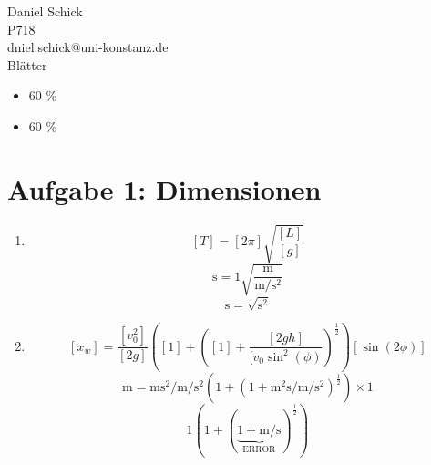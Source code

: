 \documentclass{gadsescript}
\begin{document}
\maketitle
Daniel Schick\\
P718\\
dniel.schick@uni-konstanz.de\\
Blätter\\
\begin{itemize}
	\item 60 \%
	\item 60 \%
\end{itemize}

\section*{Aufgabe 1: Dimensionen}
\begin{enumerate}[label=\alph*)]
	\item \[ [T] = [2 \pi] \sqrt{\frac{[L]}{[g]}} \]
		\[ \unit{\second} = 1 \sqrt{\frac{\unit{\metre}}{\unit{\metre\per\square\second}}} \]
		\[ \unit{\second} = \sqrt{\unit{\square\second}} \]
	\item \[ [x_w] = \frac{[v_0^2]}{[2g]} \left([1] + \left( [1] + \frac{[2gh]}{[v_0\operatorname{sin}^2(\phi)} \right)^{\frac{1}{2}} \right) [\sin (2\phi)] \]
		\[ \unit{\metre} = \unit{\metre\square\second\per\metre\per\square\second} \left( 1 + \left( 1 + \unit{\square\metre\second\per\metre\per\square\second} \right)^{\frac{1}{2}} \right) \times 1 \]
		\[ 1 \left( 1 + \left( \underbrace{1 + \unit{\metre\per\second}}_{\text{ERROR}} \right)^{\frac{1}{2}} \right) \]
\end{enumerate}
\end{document}
